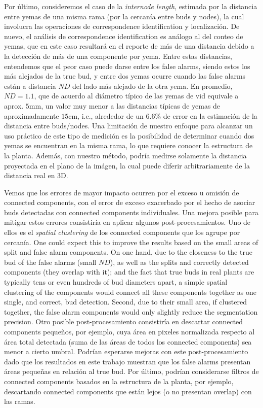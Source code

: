 \documentclass[a4paper,authoryear,review]{elsarticle}
\begin{document}
	
	Por último, consideremos el caso de la \emph{internode length}, estimada por la distancia entre yemas de una misma rama (por la cercanía entre buds y nodes), la cual involucra las operaciones de correspondence identification y localización. De nuevo, el análisis de correspondence identification es análogo al del conteo de yemas, que en este caso resultará en el reporte de más de una distancia debido a la detección de más de una componente por yema. Entre estas distancias, entendemos que el peor caso puede darse entre los false alarms, siendo estos los más alejados de la true bud, y entre dos yemas ocurre cuando las false alarms están a distancia $ND$ del lado más alejado de la otra yema. En promedio, $ND = 1.1$, que de acuerdo al diámetro típico de las yemas de vid equivale a aprox. $5$mm, un valor muy menor a las distancias típicas de yemas de aproximadamente $15$cm, i.e., alrededor de un $6.6\%$ de error en la estimación de la distancia entre buds/nodes. 
	Una limitación de nuestro enfoque para alcanzar un uso práctico de este tipo de medición es la posibilidad de determinar cuando dos yemas se encuentran en la misma rama, lo que requiere conocer la estructura de la planta.
	Además, con nuestro método, podría medirse solamente la distancia proyectada en el plano de la imágen, la cual puede diferir arbitrariamente de la distancia real en 3D. 
	
	
	Vemos que los errores de mayor impacto ocurren por el exceso u omisión de connected components, con el error de exceso exacerbado por el hecho de asociar buds detectadas con connected components individuales. 
	Una mejora posible para mitigar estos errores consistiría en aplicar algunos post-procesamientos. 
	Uno de ellos es el \emph{spatial clustering} de los connected components que los agrupe por cercanía. One could expect this to improve the results based on the small areas of split and false alarm components. On one hand, due to the closeness to the true bud of the false alarms (small $ND$), as well as the splits and  correctly detected components (they overlap with it);  and the fact that true buds in real plants are typically tens or even hundreds of bud diameters apart, a simple spatial clustering of the components would connect all these components together as one single, and correct, bud detection. Second, due to their small area, if clustered together, the false alarm components would only slightly reduce the segmentation precision.
	Otro posible post-procesamiento consistiría en descartar connected components pequeños, por ejemplo, cuya área en pixeles normalizada respecto al área total detectada (suma de las áreas de todos los connected components) sea menor a cierto umbral. Podrían esperarse mejoras con este post-procesamiento dado que los resultados en este trabajo muestran que los false alarms presentan áreas pequeñas en relación al true bud.
	Por último, podrían considerarse filtros de connected components basados en la estructura de la planta, por ejemplo, descartando connected components que están lejos (o no presentan overlap) con las ramas.
	
\end{document}
